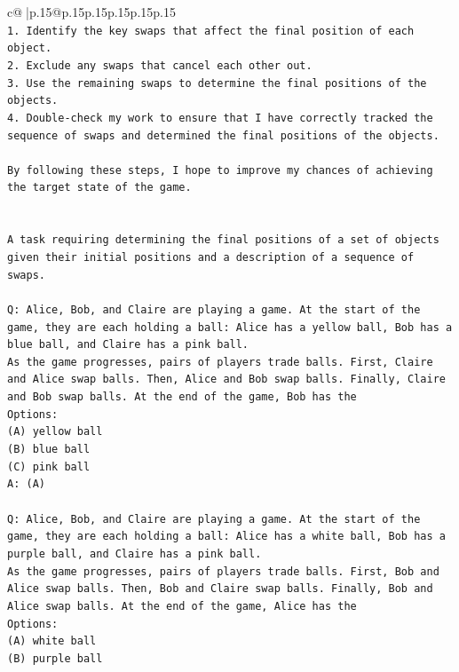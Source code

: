 \documentclass{article}
\begin{document}
{\begin{supertabular}{c@{$\;$}|p{.15\linewidth}@{}p{.15\linewidth}p{.15\linewidth}p{.15\linewidth}p{.15\linewidth}p{.15\linewidth}}
{{{\\ 
\texttt{1. Identify the key swaps that affect the final position of each object.} \\
\texttt{2. Exclude any swaps that cancel each other out.} \\
\texttt{3. Use the remaining swaps to determine the final positions of the objects.} \\
\texttt{4. Double{-}check my work to ensure that I have correctly tracked the sequence of swaps and determined the final positions of the objects.} \\
\\ 
\texttt{By following these steps, I hope to improve my chances of achieving the target state of the game.} \\
\\ 
\\ 
\texttt{A task requiring determining the final positions of a set of objects given their initial positions and a description of a sequence of swaps.} \\
\\ 
\texttt{Q: Alice, Bob, and Claire are playing a game. At the start of the game, they are each holding a ball: Alice has a yellow ball, Bob has a blue ball, and Claire has a pink ball.} \\
\texttt{As the game progresses, pairs of players trade balls. First, Claire and Alice swap balls. Then, Alice and Bob swap balls. Finally, Claire and Bob swap balls. At the end of the game, Bob has the} \\
\texttt{Options:} \\
\texttt{(A) yellow ball} \\
\texttt{(B) blue ball} \\
\texttt{(C) pink ball} \\
\texttt{A: (A)} \\
\\ 
\texttt{Q: Alice, Bob, and Claire are playing a game. At the start of the game, they are each holding a ball: Alice has a white ball, Bob has a purple ball, and Claire has a pink ball.} \\
\texttt{As the game progresses, pairs of players trade balls. First, Bob and Alice swap balls. Then, Bob and Claire swap balls. Finally, Bob and Alice swap balls. At the end of the game, Alice has the} \\
\texttt{Options:} \\
\texttt{(A) white ball} \\
\texttt{(B) purple ball} \\
}}}
\end{supertabular}}
\end{document}
